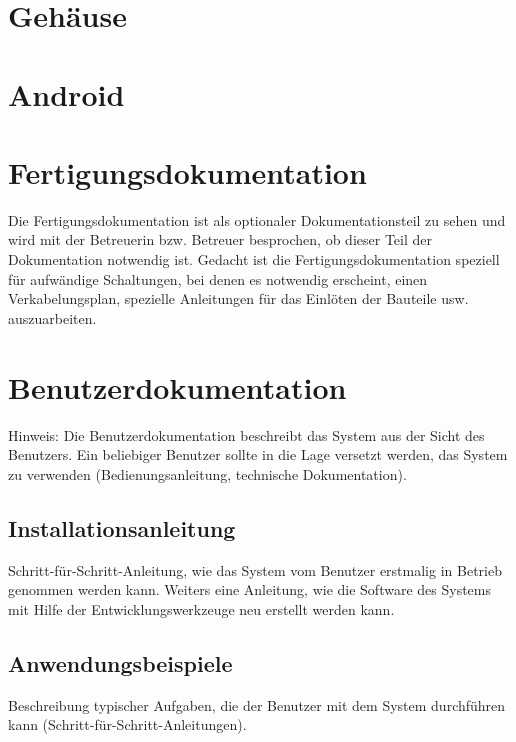 \documentclass[12pt,a4paper]{article}
\newcommand{\yhbu}[0]{\color{ydkbu}}	%
\begin{document}
{%
\clearpage\vfill\newpage{}
\section{Gehäuse}
\label{SEC:case}


\clearpage\vfill\newpage{}
\section{Android}
\label{SEC:android}


\clearpage\vfill\newpage{}
\section{\sc Fertigungsdokumentation}
	{\yhbu
	Die Fertigungsdokumentation ist als optionaler Dokumentationsteil zu sehen und
	wird mit der Betreuerin bzw. Betreuer besprochen, ob dieser Teil der Dokumentation
	notwendig ist. Gedacht ist die Fertigungsdokumentation speziell für aufwändige
	Schaltungen, bei denen es notwendig erscheint, einen Verkabelungsplan, spezielle
	Anleitungen für das Einlöten der Bauteile usw. auszuarbeiten.
	}
\section{\sc Benutzerdokumentation}
	{\yhbu
	Hinweis: Die Benutzerdokumentation beschreibt das System aus der Sicht des
	Benutzers. Ein beliebiger Benutzer sollte in die Lage versetzt werden, das System
	zu verwenden (Bedienungsanleitung, technische Dokumentation).
	}
 \subsection{Installationsanleitung}
	{\yhbu
	Schritt-für-Schritt-Anleitung, wie das System vom Benutzer erstmalig in Betrieb
	genommen werden kann. Weiters eine Anleitung, wie die Software des Systems mit
	Hilfe der Entwicklungswerkzeuge neu erstellt werden kann.
	}
 \subsection{Anwendungsbeispiele}
	{\yhbu
	Beschreibung typischer Aufgaben, die der Benutzer mit dem System durchführen
	kann (Schritt-für-Schritt-Anleitungen).
	}
}
\end{document}
